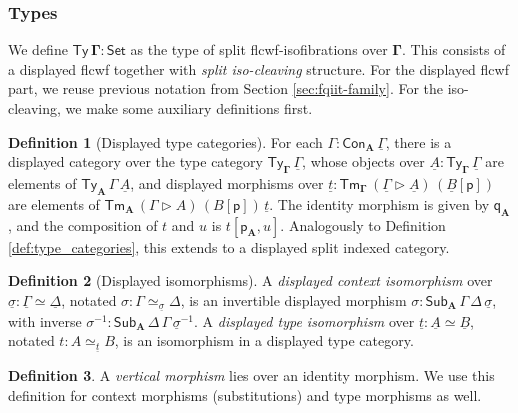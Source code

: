 \documentclass[12pt,a4paper,twoside,openany]{book}
\theoremstyle{remark}
\theoremstyle{definition}
\newtheorem{mydefinition}{Definition}
\theoremstyle{theorem}
\newcommand{\bs}[1]{\boldsymbol{#1}}
\newcommand{\Con}{\mathsf{Con}}
\newcommand{\Sub}{\mathsf{Sub}}
\newcommand{\Tm}{\mathsf{Tm}}
\newcommand{\Ty}{\mathsf{Ty}}
\newcommand{\Set}{\mathsf{Set}}
\newcommand{\ext}{\triangleright}
\newcommand{\p}{\mathsf{p}}
\newcommand{\q}{\mathsf{q}}
\newcommand{\bGamma}{\bs{\Gamma}}
\newcommand{\bA}{\bs{A}}
\newcommand{\ul}[1]{\underline{#1}}
\newcommand{\ulGamma}{\ul{\Gamma}}
\newcommand{\ulDelta}{\ul{\Delta}}
\newcommand{\ulsigma}{\ul{\sigma}}
\newcommand{\ult}{\ul{t}}
\newcommand{\ulA}{\ul{A}}
\newcommand{\ulB}{\ul{B}}
\begin{document}
\subsubsection{Types}
We define $\bs{\Ty\,\Gamma} : \Set$ as the type of split flcwf-isofibrations
over $\bGamma$. This consists of a displayed flcwf together with \emph{split iso-cleaving}
structure. For the displayed flcwf part, we reuse previous notation from Section
\ref{sec:fqiit-family}. For the iso-cleaving, we make some auxiliary definitions first.

\begin{mydefinition}[Displayed type categories]
For each $\Gamma : \Con_{\bA}\,\ulGamma$, there is a displayed category over the
type category $\Ty_{\bGamma}\,\ulGamma$, whose objects over $\ulA :
\Ty_{\bGamma}\,\ulGamma$ are elements of $\Ty_{\bA}\,\Gamma\,\ulA$, and
displayed morphisms over $\ult : \Tm_{\bGamma}\,(\ulGamma \ext
\ulA)\,(\ulB[\p])$ are elements of $\Tm_{\bA}\,(\Gamma \ext
A)\,(B[\p])\,\ult$. The identity morphism is given by $\q_{\bA}$, and the
composition of $t$ and $u$ is $t[\p_{\bA},u]$. Analogously to Definition
\ref{def:type_categories}, this extends to a displayed split indexed category.
\end{mydefinition}

\begin{mydefinition}[Displayed isomorphisms]
\label{def:displayed-iso}
A \emph{displayed context isomorphism} over $\ulsigma : \ulGamma \simeq
\ulDelta$, notated $\sigma : \Gamma \simeq_{\ulsigma} \Delta$, is an invertible
displayed morphism $\sigma : \Sub_{\bA}\,\Gamma\,\Delta\,\ulsigma$, with inverse
$\sigma^{-1} : \Sub_{\bA}\,\Delta\,\Gamma\,\ulsigma^{-1}$. A \emph{displayed
  type isomorphism} over $\ult : \ulA \simeq \ulB$, notated $t : A \simeq_{\ult}
B$, is an isomorphism in a displayed type category.
\end{mydefinition}

\begin{mydefinition}
A \emph{vertical morphism} lies over an identity morphism. We use this
definition for context morphisms (substitutions) and type morphisms as well.
\end{mydefinition}
\end{document}
